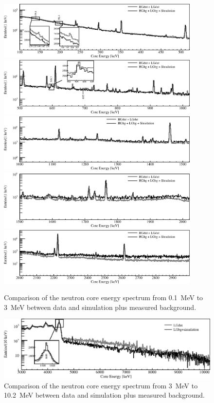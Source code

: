 \begin{figure}[tbhp]
  \centering
  \includegraphics[width=0.9\textwidth,clip]{spectra_0_520keVm}
  \includegraphics[width=0.9\textwidth,clip]{spectra_500_1020keVm}
  \includegraphics[width=0.9\textwidth,clip]{spectra_1000_1520keVm}
  \includegraphics[width=0.9\textwidth,clip]{spectra_1500_2020keVm}
  \includegraphics[width=0.9\textwidth,clip]{spectra_2_3MeVm}
  \caption{Comparison of the neutron core energy spectrum from 0.1~MeV
    to 3~MeV between data and simulation plus measured background.}
  \label{fig:neu:mc}
\end{figure}

\begin{figure}[tbhp]
  \centering
  \includegraphics[width=\textwidth,clip]{spectra_3_11MeVm}
  \caption{Comparison of the neutron core energy spectrum from 3~MeV to
    10.2~MeV between data and simulation plus measured background.}
  \label{fig:neu:mcl}
\end{figure}

